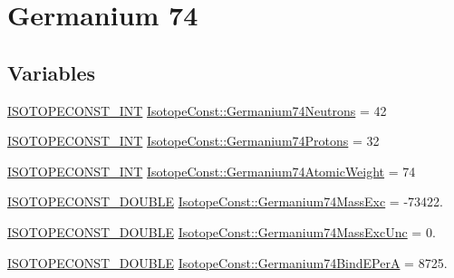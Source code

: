 \hypertarget{group___isotope_const-_germanium-_ge74}{}\section{Germanium 74}
\label{group___isotope_const-_germanium-_ge74}
\subsection*{Variables}
\begin{DoxyCompactItemize}
\item 
\mbox{\hyperlink{group___isotope_const-_macros_ga5f18360b3e99483a35c32d789e62621c}{I\+S\+O\+T\+O\+P\+E\+C\+O\+N\+S\+T\+\_\+\+I\+NT}} \mbox{\hyperlink{group___isotope_const-_germanium-_ge74_gaeefc0dae78d1ca5e595f2c729231a723}{Isotope\+Const\+::\+Germanium74\+Neutrons}} = 42
\item 
\mbox{\hyperlink{group___isotope_const-_macros_ga5f18360b3e99483a35c32d789e62621c}{I\+S\+O\+T\+O\+P\+E\+C\+O\+N\+S\+T\+\_\+\+I\+NT}} \mbox{\hyperlink{group___isotope_const-_germanium-_ge74_ga87eb6eee19cd7de86d616b65b15bd222}{Isotope\+Const\+::\+Germanium74\+Protons}} = 32
\item 
\mbox{\hyperlink{group___isotope_const-_macros_ga5f18360b3e99483a35c32d789e62621c}{I\+S\+O\+T\+O\+P\+E\+C\+O\+N\+S\+T\+\_\+\+I\+NT}} \mbox{\hyperlink{group___isotope_const-_germanium-_ge74_ga961e2e28629100b06dd60bfbf380684c}{Isotope\+Const\+::\+Germanium74\+Atomic\+Weight}} = 74
\item 
\mbox{\hyperlink{group___isotope_const-_macros_ga8f45a7272ce02c0b4c65c44636ed719a}{I\+S\+O\+T\+O\+P\+E\+C\+O\+N\+S\+T\+\_\+\+D\+O\+U\+B\+LE}} \mbox{\hyperlink{group___isotope_const-_germanium-_ge74_ga757abb30ceec5b09669e227812f13282}{Isotope\+Const\+::\+Germanium74\+Mass\+Exc}} = -\/73422.
\item 
\mbox{\hyperlink{group___isotope_const-_macros_ga8f45a7272ce02c0b4c65c44636ed719a}{I\+S\+O\+T\+O\+P\+E\+C\+O\+N\+S\+T\+\_\+\+D\+O\+U\+B\+LE}} \mbox{\hyperlink{group___isotope_const-_germanium-_ge74_gaa6c4bb380b6423ed9b14de1ba3b30713}{Isotope\+Const\+::\+Germanium74\+Mass\+Exc\+Unc}} = 0.
\item 
\mbox{\hyperlink{group___isotope_const-_macros_ga8f45a7272ce02c0b4c65c44636ed719a}{I\+S\+O\+T\+O\+P\+E\+C\+O\+N\+S\+T\+\_\+\+D\+O\+U\+B\+LE}} \mbox{\hyperlink{group___isotope_const-_germanium-_ge74_gac9205890176c9a58fd61f97c5cf90761}{Isotope\+Const\+::\+Germanium74\+Bind\+E\+PerA}} = 8725.
\item 

\end{DoxyCompactItemize}

